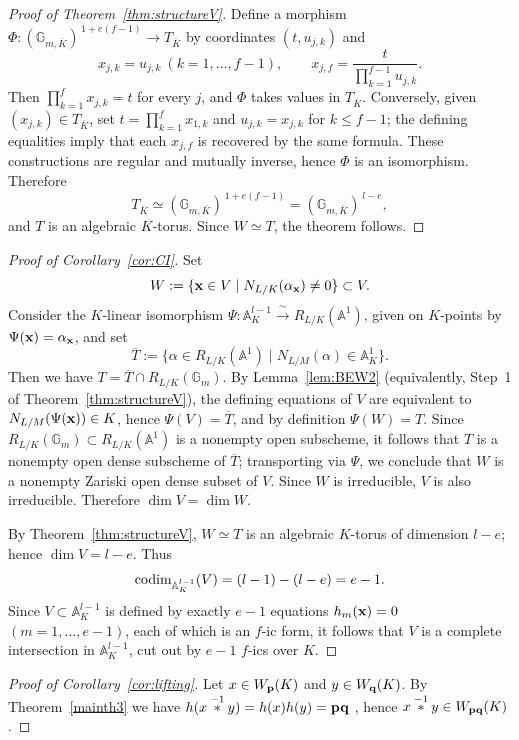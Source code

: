 \documentclass[a4paper, 11pt]{amsart}
\newcommand{\A}{\mathbb A}
\theoremstyle{plain}
\theoremstyle{definition}
\numberwithin{equation}{section}
\begin{document}
\begin{proof}[Proof of Theorem~\ref{thm:structureV}]
Define a morphism $\Phi:(\mathbb{G}_{m, \overline{K}})^{\,1+e(f-1)}\to T_{ \overline{K}}$ by coordinates $(t,u_{j,k})$ and
\[
x_{j,k}=u_{j,k}\ (k=1,\dots,f-1),\qquad
x_{j,f}=\frac{t}{\prod_{k=1}^{f-1}u_{j,k}}.
\]
Then $\prod_{k=1}^f x_{j,k}=t$ for every $j$, and $\Phi$ takes values in $T_{ \overline{K}}$.
Conversely, given $(x_{j,k})\in T_{ \overline{K}}$, set $t=\prod_{k=1}^f x_{1,k}$ and $u_{j,k}=x_{j,k}$ for $k\le f-1$; the defining equalities imply that each $x_{j,f}$ is recovered by the same formula.
These constructions are regular and mutually inverse, hence $\Phi$ is an isomorphism. Therefore
\[
T_{ \overline{K}}\simeq (\mathbb{G}_{m, \overline{K}})^{\,1+e(f-1)}=(\mathbb{G}_{m, \overline{K}})^{\,l-e},
\]
and $T$ is an algebraic $K$-torus. Since $W\simeq T$, the theorem follows.
\end{proof}

\begin{proof}[Proof of Corollary~\ref{cor:CI}]
Set
\[
W:=\{{\bf x}\in V \mid N_{L/K}(\alpha_{\bf x})\neq 0\}\subset V.
\]
Consider the $K$-linear isomorphism $\Psi:\A_K^{l-1}\xrightarrow{\ \sim\ }R_{L/K}(\A^1)$, given on $K$-points by $\Psi({\bf x})=\alpha_{\bf x}$, and set
\[
\overline T:=\{\alpha\in R_{L/K}(\A^1)\mid N_{L/M}(\alpha)\in \A^1_K\}.
\]
Then we have $T=\overline T\cap R_{L/K}({\mathbb G}_m)$.
By Lemma~\ref{lem:BEW2} (equivalently, Step~1 of Theorem~\ref{thm:structureV}), the defining equations of $V$ are equivalent to $N_{L/M}(\Psi({\bf x}))\in K$, hence $\Psi(V)=\overline T$, and by definition $\Psi(W)=T$.
Since $R_{L/K}({\mathbb G}_m)\subset R_{L/K}(\A^1)$ is a nonempty open subscheme, it follows that $T$ is a nonempty open dense subscheme of $\overline T$; transporting via $\Psi$, we conclude that $W$ is a nonempty Zariski open dense subset of $V$.
Since $W$ is irreducible, $V$ is also irreducible.
Therefore $\dim V=\dim W$.

By Theorem~\ref{thm:structureV}, $W\simeq T$ is an algebraic $K$-torus of dimension $l-e$; hence $\dim V=l-e$.
Thus
\[
{\rm codim}_{\A_K^{l-1}}(V)=(l-1)-(l-e)=e-1.
\]
Since $V\subset \A_K^{l-1}$ is defined by exactly $e-1$ equations $h_m({\bf x})=0$ $(m=1,\dots,e-1)$,
each of which is an $f$-ic form, it follows that $V$ is a complete intersection in $\mathbb{A}^{l-1}_K$, cut out by $e-1$ $f$-ics over $K$.
\end{proof}

\begin{proof}[Proof of Corollary~\ref{cor:lifting}]
Let $x\in W_{{\bf p}}(K)$ and $y\in W_{{\bf q}}(K)$. By Theorem~\ref{mainth3} we have $h(x\overset{-1}{\ast}y)=h(x)h(y)={\bf pq}$ , hence $x\overset{-1}{\ast}y\in W_{{\bf pq}}(K)$.
\end{proof}
\end{document}
